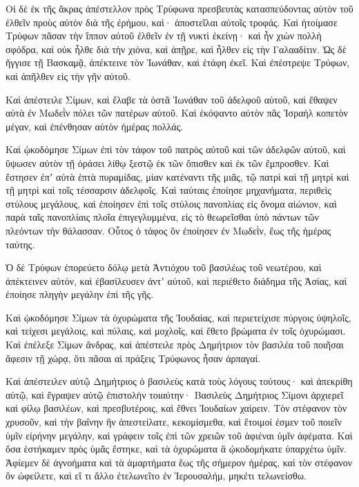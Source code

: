{\par }{\PP {}Οἱ δὲ ἐκ τῆς ἄκρας ἀπέστελλον πρὸς Τρύφωνα πρεσβευτὰς κατασπεύδοντας αὐτὸν τοῦ ἐλθεῖν προὺς αὐτὸν διὰ τῆς ἐρήμου, καὶ· ἀποστεῖλαι αὐτοῖς τροφάς.
Καὶ ἡτοίμασε Τρύφων πᾶσαν τὴν ἵππον αὐτοῦ ἐλθεῖν ἐν τῇ νυκτὶ ἐκείνῃ· καὶ ἦν χιὼν πολλὴ σφόδρα, καὶ οὐκ ἦλθε διὰ τὴν χιόνα, καὶ ἀπῇρε, καὶ ἦλθεν εἰς τὴν Γαλααδίτιν.
Ὡς δὲ ἤγγισε τῇ Βασκαμᾷ, ἀπέκτεινε τὸν Ἰωνάθαν, καὶ ἐτάφη ἐκεῖ.
Καὶ ἐπέστρεψε Τρύφων, καὶ ἀπῆλθεν εἰς τὴν γῆν αὐτοῦ.
\par }{\PP {}Καὶ ἀπέστειλε Σίμων, καὶ ἔλαβε τὰ ὀστᾶ Ἰωνάθαν τοῦ ἀδελφοῦ αὐτοῦ, καὶ ἔθαψεν αὐτὰ ἐν Μωδεῒν πόλει τῶν πατέρων αὐτοῦ.
Καὶ ἐκόψαντο αὐτὸν πᾶς Ἰσραὴλ κοπετὸν μέγαν, καὶ ἐπένθησαν αὐτὸν ἡμέρας πολλάς.
\par }{\PP {}Καὶ ᾠκοδόμησε Σίμων ἐπὶ τὸν τάφον τοῦ πατρὸς αὐτοῦ καὶ τῶν ἀδελφῶν αὐτοῦ, καὶ ὕψωσεν αὐτὸν τῇ ὁράσει λίθῳ ξεστῷ ἐκ τῶν ὄπισθεν καὶ ἐκ τῶν ἔμπροσθεν.
Καὶ ἔστησεν ἐπʼ αὐτὰ ἑπτὰ πυραμίδας, μίαν κατέναντι τῆς μιᾶς, τῷ πατρὶ καὶ τῇ μητρὶ καὶ τῇ μητρὶ καὶ τοῖς τέσσαρσιν ἀδελφοῖς.
Καὶ ταύταις ἐποίησε μηχανήματα, περιθεὶς στύλους μεγάλους, καὶ ἐποίησεν ἐπὶ τοῖς στύλοις πανοπλίας εἰς ὄνομα αἰώνιον, καὶ παρὰ ταῖς πανοπλίαις πλοῖα ἐπιγεγλυμμένα, εἰς τὸ θεωρεῖσθαι ὑπὸ πάντων τῶν πλεόντων τὴν θάλασσαν.
Οὗτος ὁ τάφος ὃν ἐποίησεν ἐν Μωδεῒν, ἕως τῆς ἡμέρας ταύτης.
\par }{\PP {}Ὁ δὲ Τρύφων ἐπορεύετο δόλῳ μετὰ Ἀντιόχου τοῦ βασιλέως τοῦ νεωτέρου, καὶ ἀπέκτεινεν αὐτὸν,
καὶ ἐβασίλευσεν ἀντʼ αὐτοῦ, καὶ περιέθετο διάδημα τῆς Ἀσίας, καὶ ἐποίησε πληγὴν μεγάλην ἐπὶ τῆς γῆς.
\par }{\PP {}Καὶ ᾠκοδόμησε Σίμων τὰ ὀχυρώματα τῆς Ἰουδαίας, καὶ περιετείχισε πύργοις ὑψηλοῖς, καὶ τείχεσι μεγάλοις, καὶ πύλαις, καὶ μοχλοῖς, καὶ ἔθετο βρώματα ἐν τοῖς ὀχυρώμασι.
Καὶ ἐπέλεξε Σίμων ἄνδρας, καὶ ἀπέστειλε πρὸς Δημήτριον τὸν βασιλέα τοῦ ποιῆσαι ἄφεσιν τῇ χώρᾳ, ὅτι πᾶσαι αἱ πράξεις Τρύφωνος ἦσαν ἁρπαγαί.
\par }{\PP {}Καὶ ἀπέστειλεν αὐτῷ Δημήτριος ὁ βασιλεὺς κατὰ τοὺς λόγους τούτους· καὶ ἀπεκρίθη αὐτῷ, καὶ ἔγραψεν αὐτῷ ἐπιστολὴν τοιαύτην·
Βασιλεὺς Δημήτριος Σίμονι ἀρχιερεῖ καὶ φίλῳ βασιλέων, καὶ πρεσβυτέροις, καὶ ἔθνει Ἰουδαίων χαίρειν.
Τὸν στέφανον τὸν χρυσοῦν, καὶ τὴν βαΐνην ἣν ἀπεστείλατε, κεκομίσμεθα, καὶ ἕτοιμοί ἐσμεν τοῦ ποιεῖν ὑμῖν εἰρήνην μεγάλην, καὶ γράφειν τοῖς ἐπὶ τῶν χρειῶν τοῦ ἀφιέναι ὑμῖν ἀφέματα.
Καὶ ὅσα ἑστήκαμεν πρὸς ὑμᾶς ἔστηκε, καὶ τὰ ὀχυρώματα ἃ ᾠκοδομήκατε ὑπαρχέτω ὑμῖν.
Ἀφίεμεν δὲ ἀγνοήματα καὶ τὰ ἁμαρτήματα ἕως τῆς σήμερον ἡμέρας, καὶ τὸν στέφανον ὃν ὠφείλετε, καὶ εἴ τι ἄλλο ἐτελωνεῖτο ἐν Ἱερουσαλήμ, μηκέτι τελωνείσθω.
}
